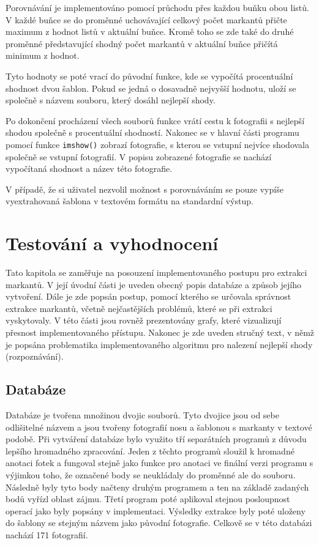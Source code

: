 Porovnávání je implementováno pomocí průchodu přes každou buňku obou listů. V každé buňce se do proměnné uchovávající celkový počet markantů přičte maximum z hodnot listů v aktuální buňce. Kromě toho se zde také do druhé proměnné představující shodný počet markantů v aktuální buňce přičítá minimum z hodnot.

Tyto hodnoty se poté vrací do původní funkce, kde se vypočítá procentuální shodnost dvou šablon. Pokud se jedná o dosavadně nejvyšší hodnotu, uloží se společně s názvem souboru, který dosáhl nejlepší shody.

Po dokončení procházení všech souborů funkce vrátí cestu k fotografii s nejlepší shodou společně s procentuální shodností. Nakonec se v hlavní části programu pomocí funkce \texttt{imshow()} zobrazí fotografie, s kterou se vstupní nejvíce shodovala společně se vstupní fotografií. V popisu zobrazené fotografie se nachází vypočítaná shodnost a název této fotografie.

V případě, že si uživatel nezvolil možnost s porovnáváním se pouze vypíše vyextrahovaná šablona v textovém formátu na standardní výstup.


\chapter{Testování a vyhodnocení}
Tato kapitola se zaměřuje na posouzení implementovaného postupu pro extrakci markantů. V její úvodní části je uveden obecný popis databáze a způsob jejího vytvoření. Dále je zde popsán postup, pomocí kterého se určovala správnost extrakce markantů, včetně nejčastějších problémů, které se při extrakci vyskytovaly. V této části jsou rovněž prezentovány grafy, které vizualizují přesnost implementovaného přístupu. Nakonec je zde uveden stručný text, v němž je popsána problematika implementovaného algoritmu pro nalezení nejlepší shody (rozpoznávání).

\section{Databáze}
Databáze je tvořena množinou dvojic souborů. Tyto dvojice jsou od sebe odlišitelné názvem a jsou tvořeny fotografií nosu a šablonou s markanty v textové podobě. Při vytváření databáze bylo využito tří separátních programů z důvodu lepšího hromadného zpracování. Jeden z těchto programů sloužil k hromadné anotaci fotek a fungoval stejně jako funkce pro anotaci ve finální verzi programu s výjimkou toho, že označené body se neukládaly do proměnné ale do souboru. Následně byly tyto body načteny druhým programem a ten na základě zadaných bodů vyřízl oblast zájmu. Třetí program poté aplikoval stejnou posloupnost operací jako byly popsány v implementaci. Výsledky extrakce byly poté uloženy do šablony se stejným názvem jako původní fotografie. Celkově se v této databázi nachází 171 fotografií. 

